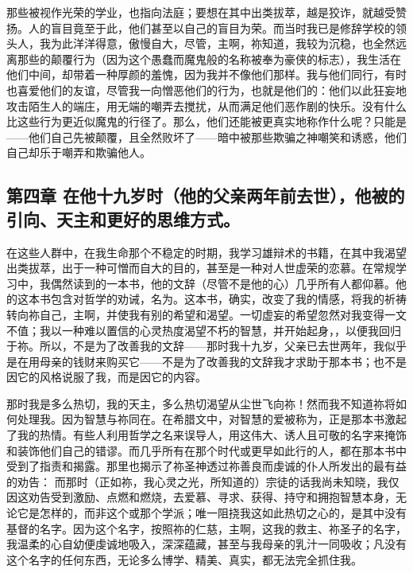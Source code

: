 那些被视作光荣的学业，也指向法庭；要想在其中出类拔萃，越是狡诈，就越受赞扬。人的盲目竟至于此，他们甚至以自己的盲目为荣。而当时我已是修辞学校的领头人，我为此洋洋得意，傲慢自大，尽管，主啊，祢知道，我较为沉稳，也全然远离那些的颠覆行为（因为这个愚蠢而魔鬼般的名称被奉为豪侠的标志），我生活在他们中间，却带着一种厚颜的羞愧，因为我并不像他们那样。我与他们同行，有时也喜爱他们的友谊，尽管我一向憎恶他们的行为，也就是他们的：他们以此狂妄地攻击陌生人的端庄，用无端的嘲弄去搅扰，从而满足他们恶作剧的快乐。没有什么比这些行为更近似魔鬼的行径了。那么，他们还能被更真实地称作什么呢？只能是——他们自己先被颠覆，且全然败坏了——暗中被那些欺骗之神嘲笑和诱惑，他们自己却乐于嘲弄和欺骗他人。\par


\subsection{第四章 在他十九岁时（他的父亲两年前去世），他被的引向、天主和更好的思维方式。}

在这些人群中，在我生命那个不稳定的时期，我学习雄辩术的书籍，在其中我渴望出类拔萃，出于一种可憎而自大的目的，甚至是一种对人世虚荣的恋慕。在常规学习中，我偶然读到的一本书，他的文辞（尽管不是他的心）几乎所有人都仰慕。他的这本书包含对哲学的劝诫，名为。这本书，确实，改变了我的情感，将我的祈祷转向祢自己，主啊，并使我有别的希望和渴望。一切虚妄的希望忽然对我变得一文不值；我以一种难以置信的心灵热度渴望不朽的智慧，并开始起身，，以便我回归于祢。所以，不是为了改善我的文辞——那时我十九岁，父亲已去世两年，我似乎是在用母亲的钱财来购买它——不是为了改善我的文辞我才求助于那本书；也不是因它的风格说服了我，而是因它的内容。\par

那时我是多么热切，我的天主，多么热切渴望从尘世飞向祢！然而我不知道祢将如何处理我。因为智慧与祢同在。在希腊文中，对智慧的爱被称为，正是那本书激起了我的热情。有些人利用哲学之名来误导人，用这伟大、诱人且可敬的名字来掩饰和装饰他们自己的错谬。而几乎所有在那个时代或更早如此行的人，都在那本书中受到了指责和揭露。那里也揭示了祢圣神透过祢善良而虔诚的仆人所发出的最有益的劝告：  而那时（正如祢，我心灵之光，所知道的）宗徒的话我尚未知晓，我仅因这劝告受到激励、点燃和燃烧，去爱慕、寻求、获得、持守和拥抱智慧本身，无论它是怎样的，而非这个或那个学派；唯一阻挠我这如此热切之心的，是其中没有基督的名字。因为这个名字，按照祢的仁慈，主啊，这我的救主、祢圣子的名字，我温柔的心自幼便虔诚地吸入，深深蕴藏，甚至与我母亲的乳汁一同吸收；凡没有这个名字的任何东西，无论多么博学、精美、真实，都无法完全抓住我。\par


